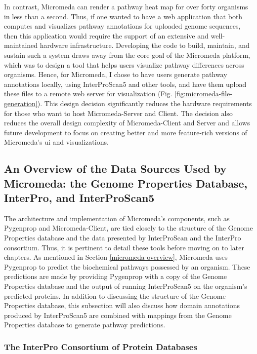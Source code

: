 In contrast, Micromeda can render a pathway heat map for over forty organisms in 
less than a second. Thus, if one wanted to have a web application that both 
computes and visualizes pathway annotations for uploaded genome sequences, then 
this application would require the support of an extensive and well-maintained 
hardware infrastructure. Developing the code to build, maintain, and sustain 
such a system draws away from the core goal of the Micromeda platform, which was 
to design a tool that helps users visualize pathway differences across 
organisms. Hence, for Micromeda, I chose to have users generate pathway 
annotations locally, using InterProScan5 and other tools, and have them upload 
these files to a remote web server for visualization (Fig. 
\ref{fig:micromeda-file-generation}). This design decision significantly reduces 
the hardware requirements for those who want to host Micromeda-Server and 
Client. The decision also reduces the overall design complexity of 
Micromeda-Client and Server and allows future development to focus on creating 
better and more feature-rich versions of Micromeda's \gls{ui} and 
visualizations.

\subsection{An Overview of the Data Sources Used by Micromeda: the Genome 
Properties Database, InterPro, and InterProScan5} \label{micromeda-data-sources} 

The architecture and implementation of Micromeda's components, such as Pygenprop 
and Micromeda-Client, are tied closely to the structure of the Genome Properties 
database and the data presented by InterProScan and the InterPro consortium. 
Thus, it is pertinent to detail these tools before moving on to later chapters. 
As mentioned in Section \ref{micromeda-overview}, Micromeda uses Pygenprop to 
predict the biochemical pathways possessed by an organism. These predictions are 
made by providing Pygenprop with a copy of the Genome Properties database and 
the output of running InterProScan5 on the organism's predicted proteins. In 
addition to discussing the structure of the Genome Properties database, this 
subsection will also discuss how domain annotations produced by InterProScan5 are 
combined with mappings from the Genome Properties database to generate pathway 
predictions.

\subsubsection{The InterPro Consortium of Protein Databases} 

